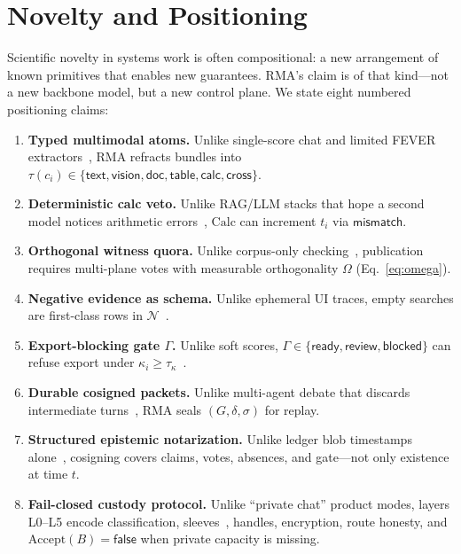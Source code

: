 \documentclass[journal,10pt,twocolumn,a4paper]{IEEEtran}
\begin{document}
\section{Novelty and Positioning}
\label{sec:novelty}

Scientific novelty in systems work is often compositional: a new arrangement of known primitives that enables new guarantees.
RMA's claim is of that kind---not a new backbone model, but a new control plane.
We state eight numbered positioning claims:

\begin{enumerate}
  \item[\textbf{N1}] \textbf{Typed multimodal atoms.}
  Unlike single-score chat and limited FEVER extractors~\cite{thorne2018fever,guo2022survey}, RMA refracts bundles into
  $\tau(c_i)\in\{\mathsf{text},\mathsf{vision},\mathsf{doc},\mathsf{table},\mathsf{calc},\mathsf{cross}\}$.

  \item[\textbf{N2}] \textbf{Deterministic calc veto.}
  Unlike RAG/LLM stacks that hope a second model notices arithmetic errors~\cite{lewis2020rag,openai2023gpt4},
  $\mathrm{Calc}$ can increment $t_i$ via $\mathsf{mismatch}$.

  \item[\textbf{N3}] \textbf{Orthogonal witness quora.}
  Unlike corpus-only checking~\cite{thorne2018fever}, publication requires multi-plane votes with measurable orthogonality $\Omega$ (Eq.~\eqref{eq:omega}).

  \item[\textbf{N4}] \textbf{Negative evidence as schema.}
  Unlike ephemeral UI traces, empty searches are first-class rows in $\mathcal{N}$~\cite{silverman2015verification}.

  \item[\textbf{N5}] \textbf{Export-blocking gate $\Gamma$.}
  Unlike soft scores, $\Gamma\in\{\mathsf{ready},\mathsf{review},\mathsf{blocked}\}$ can refuse export under $\kappa_i\ge\tau_\kappa$~\cite{graves2017fact}.

  \item[\textbf{N6}] \textbf{Durable cosigned packets.}
  Unlike multi-agent debate that discards intermediate turns~\cite{wei2022chain,chen2023agents}, RMA seals $(G,\delta,\sigma)$ for replay.

  \item[\textbf{N7}] \textbf{Structured epistemic notarization.}
  Unlike ledger blob timestamps alone~\cite{nakamoto2008bitcoin,buterin2014ethereum}, cosigning covers claims, votes, absences, and gate---not only existence at time $t$.

  \item[\textbf{N8}] \textbf{Fail-closed custody protocol.}
  Unlike ``private chat'' product modes, layers L0--L5 encode classification, sleeves~\cite{chaum1981mix}, handles, encryption, route honesty, and $\mathrm{Accept}(B)=\mathsf{false}$ when private capacity is missing.
\end{enumerate}
\end{document}
